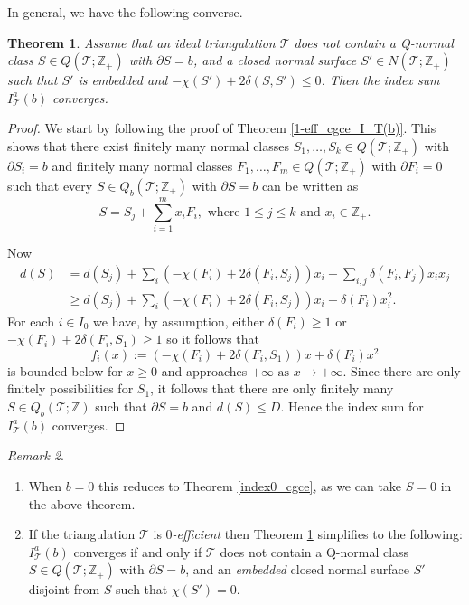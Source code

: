 \documentclass[12pt,reqno]{amsart}  %
\newtheorem{thm}{Theorem}[section]
\theoremstyle{definition}
\theoremstyle{remark}
\newtheorem{rmk}[thm]{Remark}
\newcommand{\T}{\mathcal{T}}
\def\Z{\mathbb Z}
\def\bd{\partial}
\begin{document}
In general, we have the following converse.

\begin{thm} 
\label{cgce_I_T(b)} 
Assume that an ideal triangulation $\T$ does not contain a Q-normal class 
$S \in Q(\T;\Z_+)$ with $\bd S = b$, and a closed normal surface 
$S' \in N(\T;\Z_+)$ such that $S'$ is embedded and 
$-\chi(S')+ 2\delta(S,S') \le 0$. Then the index sum $I_\T^a(b)$ converges.
\end{thm}

\begin{proof}
We start by following the proof of Theorem \ref{1-eff_cgce_I_T(b)}. This 
shows that there exist finitely many normal classes
$S_1, \ldots, S_k \in Q(\T;\Z_+)$ with $\bd S_i=b$ and finitely many 
normal classes  $F_1, \ldots, F_m \in Q(\T;\Z_+)$ with $\bd F_i=0$ 
such that every $S \in Q_b(\T;\Z_+)$ with $\bd S = b$  can be written as
$$
S= S_j + \sum_{i=1}^m x_i F_i, \text{ where } 1\le j \le k 
\text{ and } x_i \in \Z_+.
$$

Now 
\begin{align*}
d(S) 
&= d(S_j)+ \sum_{i} (-\chi(F_i)+ 2 \delta(F_i,S_j))x_i 
+ \sum_{i ,j } \delta(F_i,F_j) x_i x_j \\
&\ge  d(S_j)+ \sum_{i} (-\chi(F_i)+ 2 \delta(F_i,S_j))x_i  
+ \delta(F_i) x_i ^2 .
\end{align*}
For each $i \in I_0$ we have, by assumption,  either $\delta(F_i)\ge 1$ 
or $-\chi(F_i)+ 2 \delta(F_i,S_1) \ge 1$ so it follows that 
$$
f_i(x):=(-\chi(F_i)+ 2 \delta(F_i,S_1))x  + \delta(F_i) x^2
$$
is bounded below for $x \ge 0$ and approaches 
$+\infty \text{ as } x\to +\infty.$
Since  there are only finitely possibilities  for $S_1$,
it follows that there are only finitely
many $S \in Q_b(\T;\Z)$ such that $\bd S = b$ and $d(S) \le D$. Hence the 
index sum for $I_\T^a(b)$ converges.
\end{proof}

\medskip

\begin{rmk}
\begin{enumerate}
\item 
When $b=0$ this reduces to Theorem \ref{index0_cgce}, as we can take $S=0$ 
in the above theorem.
\item 
If the triangulation $\T$ is {\em $0$-efficient} then 
Theorem \ref{cgce_I_T(b)} simplifies to the following: \\
$I_\T^a(b)$ converges if and only if $\T$ 
does not contain a Q-normal class $S \in Q(\T;\Z_+)$ with $\bd S = b$,  
and an \emph{embedded} closed normal surface $S'$ disjoint from $S$ such 
that  $\chi(S') =0$.
\end{enumerate}
\end{rmk}
\end{document}
